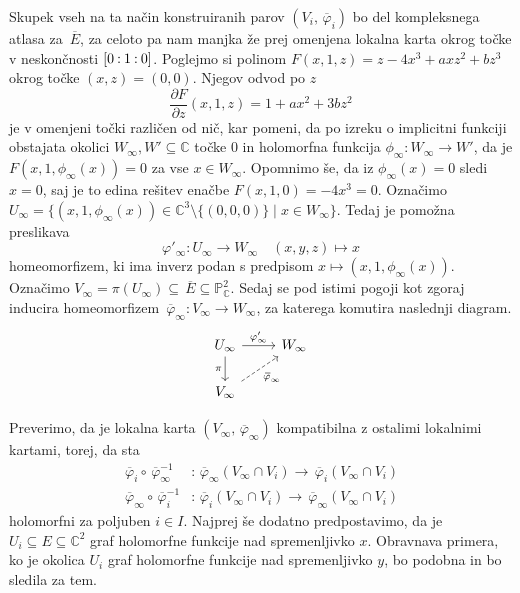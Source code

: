 \documentclass[mat1]{fmfdelo}
\numberwithin{equation}{section}
\newcommand{\C}{\mathbb C}
\newcommand{\PC}{\mathbb{P}^2_\C}
\newcommand{\inv}{^{-1}}
\newcommand{\pcoor}[1]{%
\begingroup\lccode`~=`: \lowercase{\endgroup
\edef~}{\mathbin{\mathchar\the\mathcode`:}\nobreak}%
\left[%
\begingroup
\mathcode`:=\string"8000
#1%
\endgroup
\right]%
}
\newcommand{\pdv}[2][]{\frac{\partial#1}{\partial#2}}
\newcommand{\olsi}[1]{\,\overline{\!{#1}}} %
\theoremstyle{definition}
\begin{document}
Skupek vseh na ta način konstruiranih parov $(V_i, \olsi{\varphi}_i)$ bo del kompleksnega atlasa za $\olsi{E}$, za celoto pa nam manjka že prej omenjena lokalna karta okrog točke v neskončnosti $\pcoor{0 : 1 : 0}$. Poglejmo si polinom $F(x, 1, z) = z - 4x^3 + axz^2 + bz^3$ okrog točke $(x,z) = (0,0)$. Njegov odvod po $z$ 
\[
    \pdv[F]{z}(x,1,z) = 1 + ax^2 + 3bz^2
\]
je v omenjeni točki različen od nič, kar pomeni, da po izreku o implicitni funkciji obstajata okolici $W_\infty, W' \subseteq \C$ točke $0$ in holomorfna funkcija $\phi_\infty : W_\infty \to W'$, da je $F(x, 1, \phi_\infty(x)) = 0$ za vse $x \in W_\infty$. Opomnimo še, da iz $\phi_\infty(x) = 0$ sledi $x = 0$, saj je to edina rešitev enačbe $F(x, 1, 0) = -4x^3 = 0$. Označimo $U_\infty = \{(x, 1, \phi_\infty(x)) \in \C^3 \setminus \{(0,0,0)\}\mid x \in W_\infty\}$. Tedaj je pomožna preslikava 
\[
    \varphi'_\infty : U_\infty \to W_\infty \quad (x,y,z) \mapsto x
\]
homeomorfizem, ki ima inverz podan s predpisom $x \mapsto (x,1,\phi_\infty(x))$. Označimo $V_\infty = \pi(U_\infty) \subseteq \olsi{E} \subseteq \PC$. Sedaj se pod istimi pogoji kot zgoraj inducira homeomorfizem $\olsi{\varphi}_\infty : V_\infty \to W_\infty$, za katerega komutira naslednji diagram.
\begin{equation}
    \label{projektivna karta v inf diagram}    
    \begin{tikzcd}
        U_\infty \arrow{r}{\varphi'_\infty} \ar[labels=left]{d}{\pi} & W_\infty \\
        V_\infty \ar[dashed, labels=below right]{ur}{\olsi{\varphi}_\infty}
    \end{tikzcd}
\end{equation}   

Preverimo, da je lokalna karta $(V_\infty, \olsi{\varphi}_\infty)$ kompatibilna z ostalimi lokalnimi kartami, torej, da sta
\begin{align*}
    \olsi{\varphi}_i \circ \olsi{\varphi}_\infty\inv &: \olsi{\varphi}_\infty(V_\infty \cap V_i) \to \olsi{\varphi}_i(V_\infty \cap V_i) \\
    \olsi{\varphi}_\infty \circ \olsi{\varphi}_i\inv &: \olsi{\varphi}_i(V_\infty \cap V_i) \to \olsi{\varphi}_\infty(V_\infty \cap V_i)
\end{align*}
holomorfni za poljuben $i \in I$. Najprej še dodatno predpostavimo, da je $U_i \subseteq E \subseteq \C^2$ graf holomorfne funkcije nad spremenljivko $x$. Obravnava primera, ko je okolica $U_i$ graf holomorfne funkcije nad spremenljivko $y$, bo podobna in bo sledila za tem.
\end{document}
